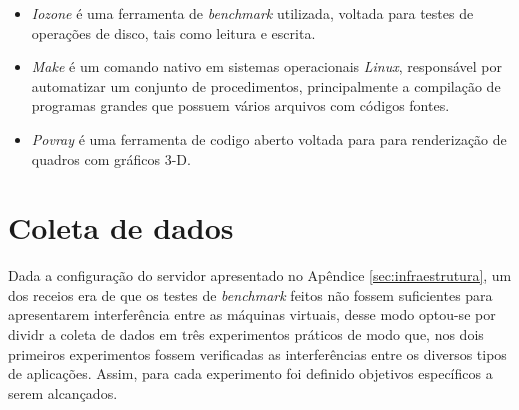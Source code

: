 \begin{itemize}
\item \textit{Iozone} \footnotemark[6] é uma ferramenta de \textit{benchmark} utilizada, voltada para testes de operações de disco, tais como leitura e escrita.

\item \textit{Make} é um comando nativo em sistemas operacionais \textit{Linux}, responsável por automatizar um conjunto de procedimentos, principalmente  a compilação de programas grandes que possuem vários arquivos com códigos fontes. 

\item \textit{Povray} \footnotemark[7] é uma ferramenta de codigo aberto voltada para para renderização de quadros com gráficos 3-D.

\end{itemize}



\section{Coleta de dados} 
Dada a configuração do servidor apresentado no Apêndice \ref{sec:infraestrutura}, um dos receios era de que os testes de \textit{benchmark} feitos não fossem suficientes para apresentarem interferência entre as máquinas virtuais, desse modo optou-se por dividr a coleta de dados em três experimentos práticos de modo que, nos dois primeiros experimentos fossem verificadas as interferências entre os diversos tipos de aplicações. Assim, para cada experimento foi definido objetivos específicos a serem alcançados.

